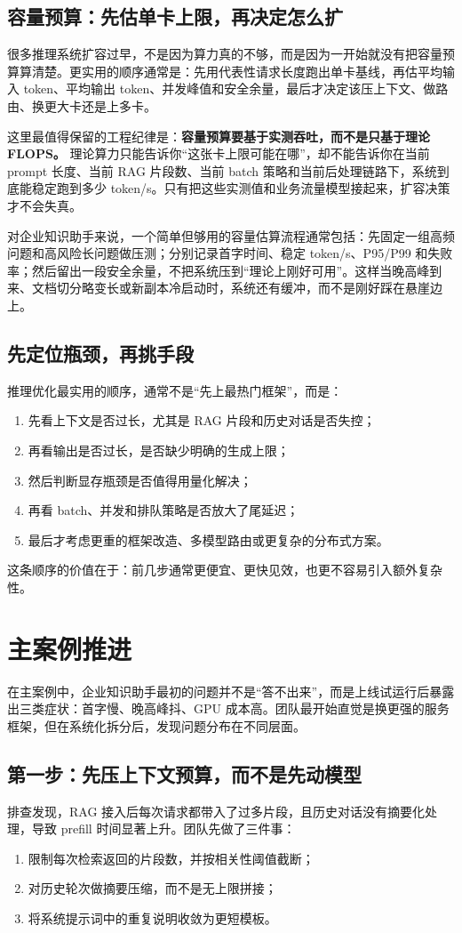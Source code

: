 \subsection{容量预算：先估单卡上限，再决定怎么扩}
很多推理系统扩容过早，不是因为算力真的不够，而是因为一开始就没有把容量预算算清楚。更实用的顺序通常是：先用代表性请求长度跑出单卡基线，再估平均输入 token、平均输出 token、并发峰值和安全余量，最后才决定该压上下文、做路由、换更大卡还是上多卡。

这里最值得保留的工程纪律是：\textbf{容量预算要基于实测吞吐，而不是只基于理论 FLOPS。} 理论算力只能告诉你“这张卡上限可能在哪”，却不能告诉你在当前 prompt 长度、当前 RAG 片段数、当前 batch 策略和当前后处理链路下，系统到底能稳定跑到多少 token/s。只有把这些实测值和业务流量模型接起来，扩容决策才不会失真。

对企业知识助手来说，一个简单但够用的容量估算流程通常包括：先固定一组高频问题和高风险长问题做压测；分别记录首字时间、稳定 token/s、P95/P99 和失败率；然后留出一段安全余量，不把系统压到“理论上刚好可用”。这样当晚高峰到来、文档切分略变长或新副本冷启动时，系统还有缓冲，而不是刚好踩在悬崖边上。

\subsection{先定位瓶颈，再挑手段}
推理优化最实用的顺序，通常不是“先上最热门框架”，而是：
\begin{enumerate}
  \item 先看上下文是否过长，尤其是 RAG 片段和历史对话是否失控；
  \item 再看输出是否过长，是否缺少明确的生成上限；
  \item 然后判断显存瓶颈是否值得用量化解决；
  \item 再看 batch、并发和排队策略是否放大了尾延迟；
  \item 最后才考虑更重的框架改造、多模型路由或更复杂的分布式方案。
\end{enumerate}

这条顺序的价值在于：前几步通常更便宜、更快见效，也更不容易引入额外复杂性。

\section{主案例推进}
在主案例中，企业知识助手最初的问题并不是“答不出来”，而是上线试运行后暴露出三类症状：首字慢、晚高峰抖、GPU 成本高。团队最开始直觉是换更强的服务框架，但在系统化拆分后，发现问题分布在不同层面。

\subsection{第一步：先压上下文预算，而不是先动模型}
排查发现，RAG 接入后每次请求都带入了过多片段，且历史对话没有摘要化处理，导致 prefill 时间显著上升。团队先做了三件事：
\begin{enumerate}
  \item 限制每次检索返回的片段数，并按相关性阈值截断；
  \item 对历史轮次做摘要压缩，而不是无上限拼接；
  \item 将系统提示词中的重复说明收敛为更短模板。
\end{enumerate}

